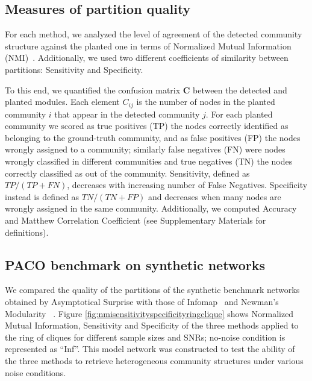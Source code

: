 \subsection{Measures of partition quality}
For each method, we analyzed the level of agreement of the detected community structure against the planted one in terms of Normalized Mutual Information (NMI)~\cite{danon2005}.
Additionally, we used two different coefficients of similarity between partitions: Sensitivity and Specificity. 

To this end, we quantified the confusion matrix $\mathbf{C}$ between the detected and planted modules. Each element $C_{ij}$ is the number of nodes in the planted community $i$ that appear in the detected community $j$.
For each planted community we scored as true positives (TP) the nodes correctly identified as belonging to the ground-truth community, and as false positives (FP) the nodes wrongly assigned to a community; similarly false negatives (FN) were nodes wrongly classified in different communities and true negatives (TN) the nodes correctly classified as out of the community.
Sensitivity, defined as $TP/(TP+FN)$, decreases with increasing number of False Negatives. Specificity instead is defined as $TN/(TN+FP)$ and decreases when many nodes are wrongly assigned in the same community.
Additionally, we computed Accuracy and Matthew Correlation Coefficient (see Supplementary Materials for definitions).


\subsection{PACO benchmark on synthetic networks}
We compared the quality of the partitions of the synthetic benchmark networks obtained by Asymptotical Surprise with those of Infomap~\cite{rosvall2008} and Newman's Modularity ~\cite{newman2006,blondel2008}. Figure \ref{fig:nmisensitivityspecificityringclique} shows Normalized Mutual Information, Sensitivity and Specificity of the three methods applied to the ring of cliques for different sample sizes and SNRs; no-noise condition is represented as ``Inf''.
This model network was constructed to test the ability of the three methods to retrieve heterogeneous community structures under various noise conditions.

